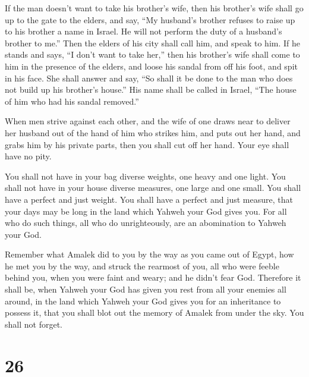  If the man doesn't want to take his brother's wife, then
his brother's wife shall go up to the gate to the elders, and say, ``My
husband's brother refuses to raise up to his brother a name in Israel.
He will not perform the duty of a husband's brother to me.''
 Then the elders of his city shall call him, and speak to
him. If he stands and says, ``I don't want to take her,'' 
then his brother's wife shall come to him in the presence of the elders,
and loose his sandal from off his foot, and spit in his face. She shall
answer and say, ``So shall it be done to the man who does not build up
his brother's house.''  His name shall be called in
Israel, ``The house of him who had his sandal removed.''

 When men strive against each other, and the wife of one
draws near to deliver her husband out of the hand of him who strikes
him, and puts out her hand, and grabs him by his private parts,
 then you shall cut off her hand. Your eye shall have no
pity.

 You shall not have in your bag diverse weights, one
heavy and one light.  You shall not have in your house
diverse measures, one large and one small.  You shall
have a perfect and just weight. You shall have a perfect and just
measure, that your days may be long in the land which Yahweh your God
gives you.  For all who do such things, all who do
unrighteously, are an abomination to Yahweh your God.

 Remember what Amalek did to you by the way as you came
out of Egypt,  how he met you by the way, and struck the
rearmost of you, all who were feeble behind you, when you were faint and
weary; and he didn't fear God.  Therefore it shall be,
when Yahweh your God has given you rest from all your enemies all
around, in the land which Yahweh your God gives you for an inheritance
to possess it, that you shall blot out the memory of Amalek from under
the sky. You shall not forget.

\hypertarget{section-25}{%
\section{26}\label{section-25}}

